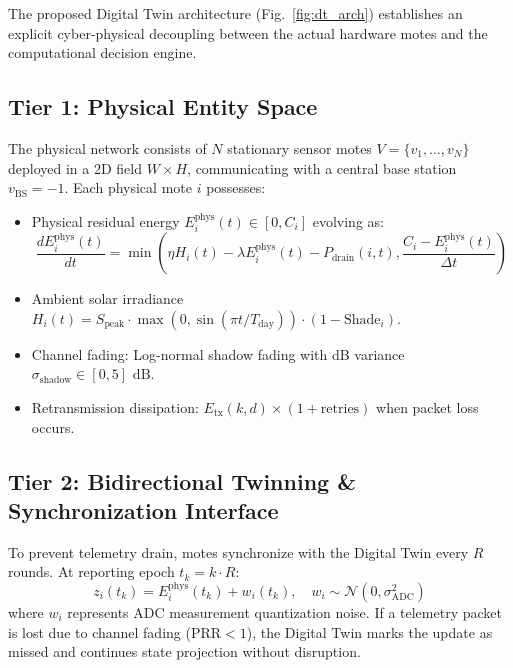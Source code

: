 \documentclass[journal]{IEEEtran}
\begin{document}
The proposed Digital Twin architecture (Fig.~\ref{fig:dt_arch}) establishes an explicit cyber-physical decoupling between the actual hardware motes and the computational decision engine.

\subsection{Tier 1: Physical Entity Space}
The physical network consists of $N$ stationary sensor motes $V = \{v_1, \dots, v_N\}$ deployed in a 2D field $W \times H$, communicating with a central base station $v_{\text{BS}} = -1$.
Each physical mote $i$ possesses:
\begin{itemize}
    \item Physical residual energy $E_i^{\text{phys}}(t) \in [0, C_i]$ evolving as:
    \begin{equation}
    \frac{dE_i^{\text{phys}}(t)}{dt} = \min\left( \eta H_i(t) - \lambda E_i^{\text{phys}}(t) - P_{\text{drain}}(i, t), \frac{C_i - E_i^{\text{phys}}(t)}{\Delta t} \right)
    \end{equation}
    \item Ambient solar irradiance $H_i(t) = S_{\text{peak}} \cdot \max(0, \sin(\pi t / T_{\text{day}})) \cdot (1 - \text{Shade}_i)$.
    \item Channel fading: Log-normal shadow fading with dB variance $\sigma_{\text{shadow}} \in [0, 5]\text{ dB}$.
    \item Retransmission dissipation: $E_{\text{tx}}(k, d) \times (1 + \text{retries})$ when packet loss occurs.
\end{itemize}

\subsection{Tier 2: Bidirectional Twinning & Synchronization Interface}
To prevent telemetry drain, motes synchronize with the Digital Twin every $R$ rounds. At reporting epoch $t_k = k \cdot R$:
\begin{equation}
z_i(t_k) = E_i^{\text{phys}}(t_k) + w_i(t_k), \quad w_i \sim \mathcal{N}(0, \sigma_{\text{ADC}}^2)
\end{equation}
where $w_i$ represents ADC measurement quantization noise. If a telemetry packet is lost due to channel fading ($\text{PRR} < 1$), the Digital Twin marks the update as missed and continues state projection without disruption.
\end{document}
